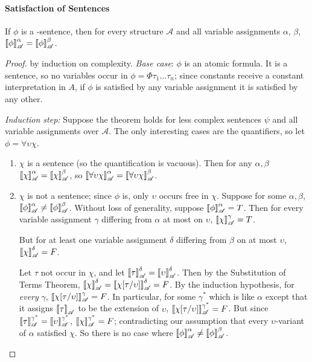 \paragraph{Satisfaction of Sentences}

\begin{theorem} \label{ssev}
	If $\phi$ is a \ltwo-sentence, then for every structure $\mathscr{A}$ and all variable assignments $\alpha$, $\beta$, $\valsa{\phi}=\vals{\phi}{A}{\beta}$.	
 \begin{proof}
	by induction on complexity. \emph{Base case}: $\phi$ is an atomic formula. It is a sentence, so no variables occur in $\phi=\Phi\tau_{1}\ldots\tau_{n}$; since constants receive a constant interpretation in $A$, if $\phi$ is satisfied by any variable assignment it is satisfied by any other.

			\emph{Induction step:} Suppose the theorem holds for less complex sentences $\psi$ and all variable assignments over $\mathscr{A}$. The only interesting cases are the quantifiers, so let $\phi=\forall \upsilon\chi$.
 \begin{enumerate}
			\item $\chi$ is a sentence (so the quantification is vacuous). Then for any $\alpha,\beta$ $\valsa{\chi}=\vals{\chi}{A}{\beta}$, so $\valsa{\forall\upsilon\chi}=\vals{\forall\upsilon\chi}{A}{\beta}$.
			\item $\chi$ is not a sentence; since $\phi$ is, only $\upsilon$ occurs free in $\chi$. Suppose for some $\alpha,\beta$, $\valsa{\phi}\neq\vals{\phi}{A}{\beta}$. Without loss of generality, suppose $\valsa{\phi}=T$. Then for every variable assignment $\gamma$ differing from $\alpha$ at most on $\upsilon$, $\vals{\chi}{A}{\gamma}=T$.
			
			But for at least one variable assignment $\delta$ differing from $\beta$ on at most $\upsilon$, $\vals{\chi}{A}{\delta}=F$. 
			
			Let $\tau$ not occur in $\chi$, and let $\vals{\tau}{A}{\delta}=\vals{\upsilon}{A}{\delta}$. Then by the Substitution of Terms Theorem, $\vals{\chi}{A}{\delta}=\vals{\chi[\tau/\upsilon]}{A}{\delta}=F$. By the induction hypothesis, for \emph{every} $\gamma$, $\vals{\chi[\tau/\upsilon]}{A}{\gamma}=F$. In particular, for some $\gamma^{*}$ which is like $\alpha$ except that it assigns $\val{\tau}{A}$ to be the extension of $\upsilon$, $\vals{\chi[\tau/\upsilon]}{A}{\gamma^{*}}=F$. But since $\vals{\tau}{A}{\gamma^{*}}=\vals{\upsilon}{A}{\gamma^{*}}$, $\vals{\chi}{A}{\gamma^{*}}=F$; contradicting our assumption that every $\upsilon$-variant of $\alpha$ satisfied $\chi$. So there is no case where $\valsa{\phi}\neq\vals{\phi}{A}{\beta}$. 
		\end{enumerate}	\end{proof}	\end{theorem}
		


